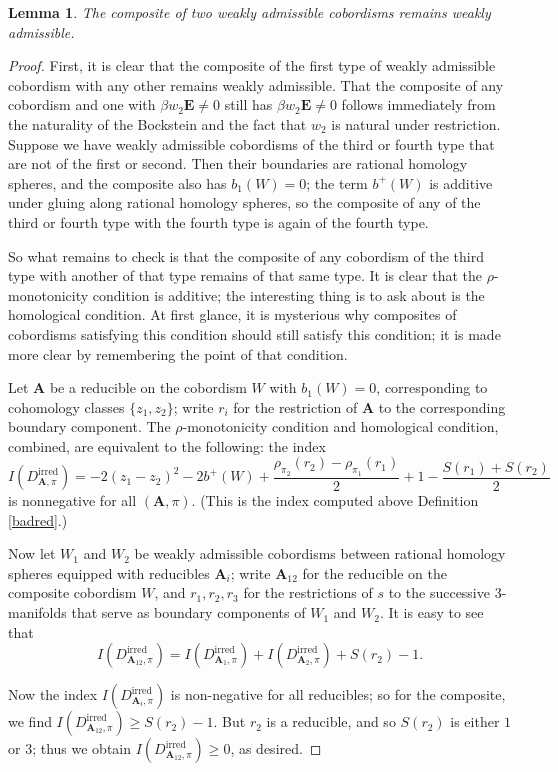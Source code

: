 \documentclass{memo-l}
\newtheorem{lemma}[theorem]{Lemma}
\theoremstyle{definition}
\theoremstyle{remark}
\numberwithin{section}{chapter}
\numberwithin{equation}{chapter}
\begin{document}
\begin{lemma}\label{composable-cob}The composite of two weakly admissible cobordisms remains weakly admissible.
\end{lemma}
\begin{proof}First, it is clear that the composite of the first type of weakly admissible cobordism with any other remains weakly admissible. That the composite of any cobordism and one with $\beta w_2 \mathbf{E} \neq 0$ still has $\beta w_2 \mathbf{E} \neq 0$ follows immediately from the naturality of the Bockstein and the fact that $w_2$ is natural under restriction. Suppose we have weakly admissible cobordisms of the third or fourth type that are not of the first or second. Then their boundaries are rational homology spheres, and the composite also has $b_1(W) = 0$; the term $b^+(W)$ is additive under gluing along rational homology spheres, so the composite of any of the third or fourth type with the fourth type is again of the fourth type.

So what remains to check is that the composite of any cobordism of the third type with another of that type remains of that same type. It is clear that the $\rho$-monotonicity condition is additive; the interesting thing is to ask about is the homological condition. At first glance, it is mysterious why composites of cobordisms satisfying this condition should still satisfy this condition; it is made more clear by remembering the point of that condition.

Let $\mathbf{A}$ be a reducible on the cobordism $W$ with $b_1(W) = 0$, corresponding to cohomology classes $\{z_1, z_2\}$; write $r_i$ for the restriction of $\mathbf{A}$ to the corresponding boundary component.
The $\rho$-monotonicity condition and homological condition, combined, are equivalent to the following: the index $$I(D^\text{irred}_{\mathbf{A},\pi}) = -2(z_1-z_2)^2 - 2b^+(W) + \frac{\rho_{\pi_2}(r_2) - \rho_{\pi_1}(r_1)}{2} + 1 - \frac{S(r_1) + S(r_2)}{2}$$ is nonnegative for all $(\mathbf{A},\pi)$. (This is the index computed above Definition \ref{badred}.)

Now let $W_1$ and $W_2$ be weakly admissible cobordisms between rational homology spheres equipped with reducibles $\mathbf{A}_i$; write $\mathbf{A}_{12}$ for the reducible on the composite cobordism $W$, and $r_1, r_2, r_3$ for the restrictions of $s$ to the successive 3-manifolds that serve as boundary components of $W_1$ and $W_2$. It is easy to see that $$I(D^{\text{irred}}_{\mathbf{A}_{12},\pi}) = I(D^{\text{irred}}_{\mathbf{A}_1,\pi}) + I(D^{\text{irred}}_{\mathbf{A}_2,\pi}) + S(r_2) - 1.$$

Now the index $I(D^{\text{irred}}_{\mathbf{A}_i,\pi})$ is non-negative for all reducibles; so for the composite, we find $I(D^{\text{irred}}_{\mathbf{A}_{12},\pi}) \geq S(r_2) - 1.$ But $r_2$ is a reducible, and so $S(r_2)$ is either $1$ or $3$; thus we obtain $I(D^{\text{irred}}_{\mathbf{A}_{12},\pi}) \geq 0$, as desired.
\end{proof}
\end{document}
